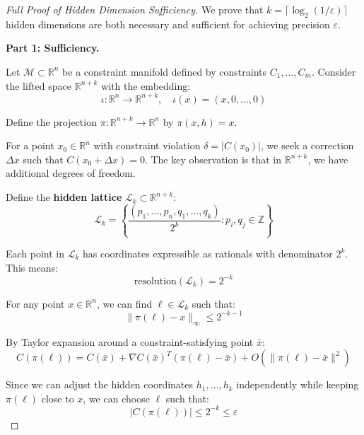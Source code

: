 \documentclass{article}
\begin{document}
\begin{proof}[Full Proof of Hidden Dimension Sufficiency]
We prove that $k = \lceil \log_2(1/\varepsilon) \rceil$ hidden dimensions are both necessary and sufficient for achieving precision $\varepsilon$.

\textbf{Part 1: Sufficiency.}

Let $\mathcal{M} \subset \mathbb{R}^n$ be a constraint manifold defined by constraints $C_1, \ldots, C_m$. Consider the lifted space $\mathbb{R}^{n+k}$ with the embedding:
\begin{equation}
\iota: \mathbb{R}^n \to \mathbb{R}^{n+k}, \quad \iota(x) = (x, 0, \ldots, 0)
\end{equation}

Define the projection $\pi: \mathbb{R}^{n+k} \to \mathbb{R}^n$ by $\pi(x, h) = x$.

For a point $x_0 \in \mathbb{R}^n$ with constraint violation $\delta = |C(x_0)|$, we seek a correction $\Delta x$ such that $C(x_0 + \Delta x) = 0$. The key observation is that in $\mathbb{R}^{n+k}$, we have additional degrees of freedom.

Define the \textbf{hidden lattice} $\mathcal{L}_k \subset \mathbb{R}^{n+k}$:
\begin{equation}
\mathcal{L}_k = \left\{ \frac{(p_1, \ldots, p_n, q_1, \ldots, q_k)}{2^k} : p_i, q_j \in \mathbb{Z} \right\}
\end{equation}

Each point in $\mathcal{L}_k$ has coordinates expressible as rationals with denominator $2^k$. This means:
\begin{equation}
\text{resolution}(\mathcal{L}_k) = 2^{-k}
\end{equation}

For any point $x \in \mathbb{R}^n$, we can find $\ell \in \mathcal{L}_k$ such that:
\begin{equation}
\|\pi(\ell) - x\|_\infty \leq 2^{-k-1}
\end{equation}

By Taylor expansion around a constraint-satisfying point $\bar{x}$:
\begin{equation}
C(\pi(\ell)) = C(\bar{x}) + \nabla C(\bar{x})^T(\pi(\ell) - \bar{x}) + O(\|\pi(\ell) - \bar{x}\|^2)
\end{equation}

Since we can adjust the hidden coordinates $h_1, \ldots, h_k$ independently while keeping $\pi(\ell)$ close to $x$, we can choose $\ell$ such that:
\begin{equation}
|C(\pi(\ell))| \leq 2^{-k} \leq \varepsilon
\end{equation}


\end{proof}
\end{document}
